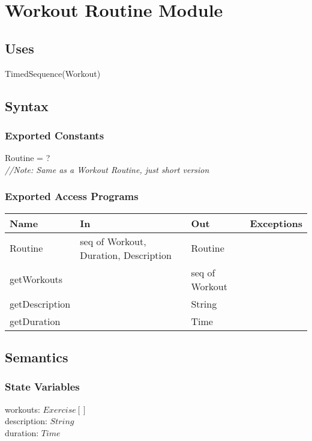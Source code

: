 \documentclass[12pt, titlepage]{article}
\begin{document}
\section{Workout Routine Module}

\subsection{Uses}
TimedSequence(Workout)
\subsection{Syntax}

\subsubsection{Exported Constants}
Routine = ? \\
\textit{//Note: Same as a Workout Routine, just short version}
\subsubsection{Exported Access Programs}

\begin{center}
	\begin{tabular}{p{2cm} p{4cm} p{4cm} p{2cm}}
		\hline
		\textbf{Name} & \textbf{In} & \textbf{Out} & \textbf{Exceptions} \\
		\hline
		Routine & seq of Workout, Duration, Description & Routine &  \\
		getWorkouts &  & seq of Workout &  \\
		getDescription &  & String &  \\
		getDuration &  & Time &  \\
		\hline
	\end{tabular}
\end{center}

\subsection{Semantics}

\subsubsection{State Variables}
workouts: $Exercise[]$ \\
description: $String$ \\
duration: $Time$ \\
\end{document}

